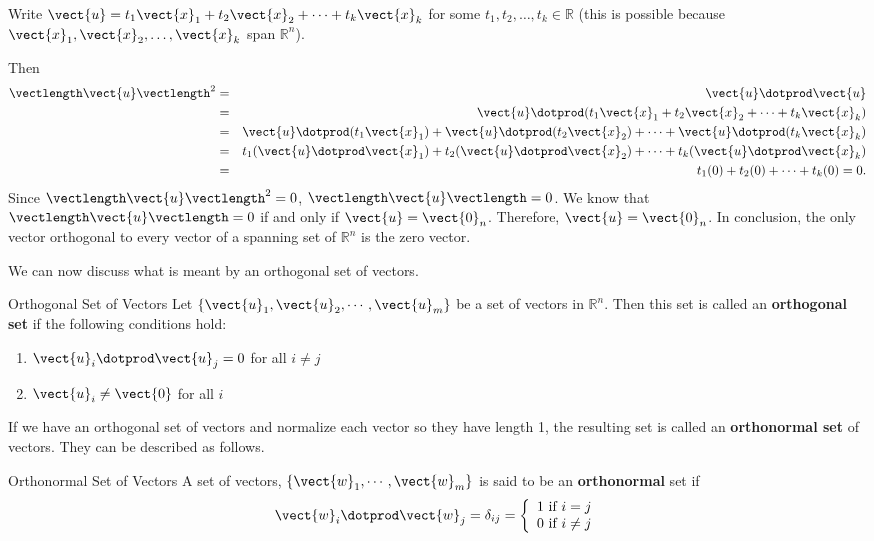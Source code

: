 \begin{solution}
Write $\vect{u}=t_1\vect{x}_1 + t_2\vect{x}_2 +\cdots +t_k\vect{x}_k$
for some $t_1, t_2, \ldots, t_k\in\mathbb{R}$
(this is possible because
$\vect{x}_1, \vect{x}_2, \ldots, \vect{x}_k$ span $\mathbb{R}^n$).
 
Then
\begin{eqnarray*}
\vectlength\vect{u}\vectlength^2 & = & \vect{u}\dotprod\vect{u} \\
& = & \vect{u}\dotprod(t_1\vect{x}_1 + t_2\vect{x}_2 +\cdots +t_k\vect{x}_k) \\
& = & \vect{u}\dotprod (t_1\vect{x}_1) +  \vect{u}\dotprod (t_2\vect{x}_2) +
\cdots +  \vect{u}\dotprod (t_k\vect{x}_k) \\
& = & t_1(\vect{u}\dotprod \vect{x}_1) + t_2(\vect{u}\dotprod \vect{x}_2) + \cdots 
+ t_k(\vect{u}\dotprod \vect{x}_k) \\
& = & t_1(0) + t_2(0) + \cdots + t_k(0) = 0.
\end{eqnarray*}
Since $\vectlength\vect{u}\vectlength^2 =0$, $\vectlength\vect{u}\vectlength =0$.
We know that $\vectlength\vect{u}\vectlength=0$ if and only if 
$\vect{u}=\vect{0}_n$.
Therefore, $\vect{u}=\vect{0}_n$.
In conclusion, the only vector orthogonal to every vector of
a spanning set of $\mathbb{R}^n$ is the zero vector.
\end{solution}

We can now discuss what is meant by an orthogonal set of vectors. 

\begin{definition}{Orthogonal Set of Vectors}\label{def:orthset}
Let $\{ \vect{u}_1, \vect{u}_2, \cdots, \vect{u}_m \}$ be a set of
vectors in $\mathbb{R}^n$. Then this set is called an
\textbf{orthogonal set} if the following conditions hold:
\begin{enumerate}
\item 
$\vect{u}_i \dotprod \vect{u}_j = 0$ for all $i \neq j$ 
\item
$\vect{u}_i \neq \vect{0}$ for all $i$
\end{enumerate}
\end{definition}

If we have an orthogonal set of vectors and normalize each vector so
they have length 1, the resulting set is called an \textbf{orthonormal
set} of vectors. They can be described as follows.

\begin{definition}{Orthonormal Set of Vectors}\label{def:orthoSetVectors}
A set of vectors, $\left\{ \vect{w}_{1},\cdots ,\vect{w}_{m}\right\} $
is said to be an
 \textbf{orthonormal} set if 
\[
\vect{w}_i \dotprod \vect{w}_j = \delta _{ij} = \left\{ 
\begin{array}{c}
1\text{ if }i=j \\ 
0\text{ if }i\neq j
\end{array}
\right.
\]
\end{definition}


